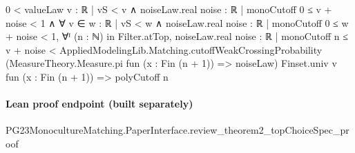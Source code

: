 \documentclass[10pt]{article}
\begin{document}
\begin{ReviewVerbatim}
                            0 < valueLaw {v : ℝ | vS < v ∧ noiseLaw.real {noise : ℝ | monoCutoff 0 ≤ v + noise} < 1} ∧
                              ∀ v ∈ {w : ℝ | vS < w ∧ noiseLaw.real {noise : ℝ | monoCutoff 0 ≤ w + noise} < 1},
                                ∀ᶠ (n : ℕ) in Filter.atTop,
                                  noiseLaw.real {noise : ℝ | monoCutoff n ≤ v + noise} <
                                    AppliedModelingLib.Matching.cutoffWeakCrossingProbability
                                      (MeasureTheory.Measure.pi fun (x : Fin (n + 1)) => noiseLaw) Finset.univ v
                                      fun (x : Fin (n + 1)) => polyCutoff n
\end{ReviewVerbatim}

\paragraph{Lean proof endpoint (built separately)}\begin{ReviewVerbatim}
PG23MonocultureMatching.PaperInterface.review_theorem2_topChoiceSpec_proof
\end{ReviewVerbatim}
\end{document}
